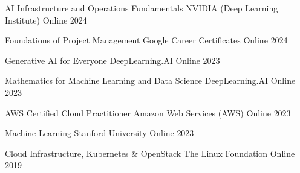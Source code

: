 

\begin{cvhonors}

  \cvhonor
    {AI Infrastructure and Operations Fundamentals} %
    {NVIDIA (Deep Learning Institute)} %
    {Online} %
    {2024} %

  \cvhonor
    {Foundations of Project Management} %
    {Google Career Certificates} %
    {Online} %
    {2024} %

  \cvhonor
    {Generative AI for Everyone} %
    {DeepLearning.AI} %
    {Online} %
    {2023} %

  \cvhonor
    {Mathematics for Machine Learning and Data Science} %
    {DeepLearning.AI} %
    {Online} %
    {2023} %

  \cvhonor
    {AWS Certified Cloud Practitioner} %
    {Amazon Web Services (AWS)} %
    {Online} %
    {2023} %

  \cvhonor
    {Machine Learning} %
    {Stanford University} %
    {Online} %
    {2023} %

  \cvhonor
    {Cloud Infrastructure, Kubernetes \& OpenStack} %
    {The Linux Foundation} %
    {Online} %
    {2019} %

\end{cvhonors}
